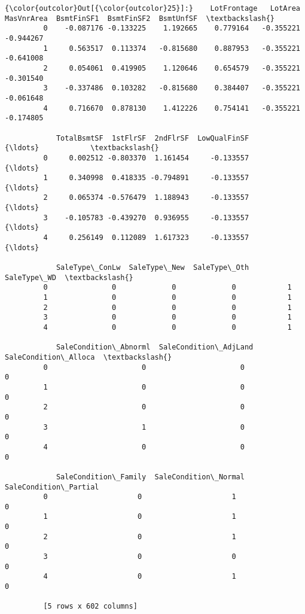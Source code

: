 \documentclass[11pt]{article}
\begin{document}
\begin{Verbatim}[commandchars=\\\{\}]
{\color{outcolor}Out[{\color{outcolor}25}]:}    LotFrontage   LotArea  MasVnrArea  BsmtFinSF1  BsmtFinSF2  BsmtUnfSF  \textbackslash{}
         0    -0.087176 -0.133225    1.192665    0.779164   -0.355221  -0.944267   
         1     0.563517  0.113374   -0.815680    0.887953   -0.355221  -0.641008   
         2     0.054061  0.419905    1.120646    0.654579   -0.355221  -0.301540   
         3    -0.337486  0.103282   -0.815680    0.384407   -0.355221  -0.061648   
         4     0.716670  0.878130    1.412226    0.754141   -0.355221  -0.174805   
         
            TotalBsmtSF  1stFlrSF  2ndFlrSF  LowQualFinSF          {\ldots}            \textbackslash{}
         0     0.002512 -0.803370  1.161454     -0.133557          {\ldots}             
         1     0.340998  0.418335 -0.794891     -0.133557          {\ldots}             
         2     0.065374 -0.576479  1.188943     -0.133557          {\ldots}             
         3    -0.105783 -0.439270  0.936955     -0.133557          {\ldots}             
         4     0.256149  0.112089  1.617323     -0.133557          {\ldots}             
         
            SaleType\_ConLw  SaleType\_New  SaleType\_Oth  SaleType\_WD  \textbackslash{}
         0               0             0             0            1   
         1               0             0             0            1   
         2               0             0             0            1   
         3               0             0             0            1   
         4               0             0             0            1   
         
            SaleCondition\_Abnorml  SaleCondition\_AdjLand  SaleCondition\_Alloca  \textbackslash{}
         0                      0                      0                     0   
         1                      0                      0                     0   
         2                      0                      0                     0   
         3                      1                      0                     0   
         4                      0                      0                     0   
         
            SaleCondition\_Family  SaleCondition\_Normal  SaleCondition\_Partial  
         0                     0                     1                      0  
         1                     0                     1                      0  
         2                     0                     1                      0  
         3                     0                     0                      0  
         4                     0                     1                      0  
         
         [5 rows x 602 columns]
\end{Verbatim}
            
\end{document}
